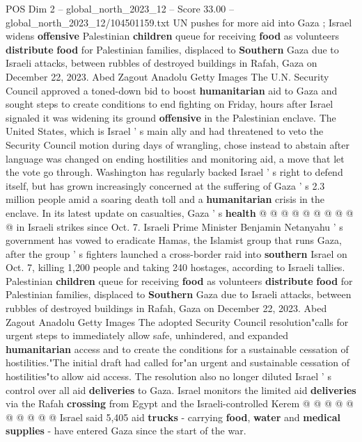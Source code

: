 \begin{textsample}{POS Dim 2 – global\_north\_2023\_12 – Score 33.00 – global\_north\_2023\_12/104501159.txt}  \label{ex:f2_pos_118}
UN pushes for more aid into Gaza ; Israel widens \textbf{offensive} Palestinian \textbf{children} queue for receiving \textbf{food} as volunteers \textbf{distribute} \textbf{food} for Palestinian families, displaced to \textbf{Southern} Gaza due to Israeli attacks, between rubbles of destroyed buildings in Rafah, Gaza on December 22, 2023.
Abed Zagout Anadolu Getty Images The U.N.
Security Council approved a toned-down bid to boost \textbf{humanitarian} aid to Gaza and sought steps to create conditions to end fighting on Friday, hours after Israel signaled it was widening its ground \textbf{offensive} in the Palestinian enclave.
The United States, which is Israel ' s main ally and had threatened to veto the Security Council motion during days of wrangling, chose instead to abstain after language was changed on ending hostilities and monitoring aid, a move that let the vote go through.
Washington has regularly backed Israel ' s right to defend itself, but has grown increasingly concerned at the suffering of Gaza ' s 2.3 million people amid a soaring death toll and a \textbf{humanitarian} crisis in the enclave.
In its latest update on casualties, Gaza ' s \textbf{health} @ @ @ @ @ @ @ @ @ @ in Israeli strikes since Oct. 7.
Israeli Prime Minister Benjamin Netanyahu ' s government has vowed to eradicate Hamas, the Islamist group that runs Gaza, after the group ' s fighters launched a cross-border raid into \textbf{southern} Israel on Oct. 7, killing 1,200 people and taking 240 hostages, according to Israeli tallies.
Palestinian \textbf{children} queue for receiving \textbf{food} as volunteers \textbf{distribute} \textbf{food} for Palestinian families, displaced to \textbf{Southern} Gaza due to Israeli attacks, between rubbles of destroyed buildings in Rafah, Gaza on December 22, 2023.
Abed Zagout Anadolu Getty Images The adopted Security Council resolution"calls for urgent steps to immediately allow safe, unhindered, and expanded \textbf{humanitarian} access and to create the conditions for a sustainable cessation of hostilities."The initial draft had called for"an urgent and sustainable cessation of hostilities"to allow aid access.
The resolution also no longer diluted Israel ' s control over all aid \textbf{deliveries} to Gaza.
Israel monitors the limited aid \textbf{deliveries} via the Rafah \textbf{crossing} from Egypt and the Israeli-controlled Kerem @ @ @ @ @ @ @ @ @ @ Israel said 5,405 aid \textbf{trucks} - carrying \textbf{food}, \textbf{water} and \textbf{medical} \textbf{supplies} - have entered Gaza since the start of the war.

\end{textsample}
